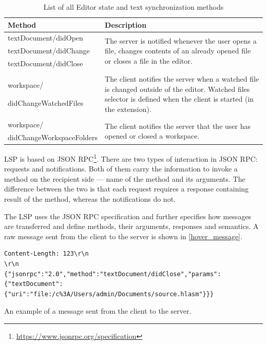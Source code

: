 \begin{table}
	\centering
	\begin{tabular}{ll}
		
		\toprule
		Method & Description \\ \midrule
		textDocument/didOpen & \multirow{3}{8.5cm}{The server is notified whenever the user opens a file, changes contents of an already opened file or closes a file in the editor.} \\
		textDocument/didChange & \\
		textDocument/didClose & \\
		& \\
		 &\multirow{4}{8.5cm}{The client notifies the server when a watched file is changed outside of the editor. Watched files selector is defined when the client is started (in the extension).} \\
		workspace/ & \\
		didChangeWatchedFiles& \\
		& \\
		& \\
		workspace/ & \multirow{2}{8.5cm}{The client notifies the server that the user has opened or closed a workspace.} \\
		didChangeWorkspaceFolders & \\ \bottomrule
	\end{tabular}
	
	\caption{List of all Editor state and text synchronization methods}
	\label{lsp_text_sync_methods}
\end{table}


LSP is based on JSON RPC\footnote{\url{https://www.jsonrpc.org/specification}}. There are two types of interaction in JSON RPC: requests and notifications. Both of them carry the information to invoke a method on the recipient side ---  name of the method and its arguments. The difference between the two is that each request requires a response containing result of the method, whereas the notifications do not.

The LSP uses the JSON RPC specification and further specifies how messages are transferred and define methods, their arguments, responses and semantics. A raw message sent from the client to the server is shown in \cref{hover_message}.

\begin{listing}
	\begin{verbatim}
Content-Length: 123\r\n
\r\n
{"jsonrpc":"2.0","method":"textDocument/didClose","params":{"textDocument":
{"uri":"file:/c%3A/Users/admin/Documents/source.hlasm"}}}
	\end{verbatim}
	\caption{An example of a message sent from the client to the server.}
	\label{hover_message}
\end{listing}

